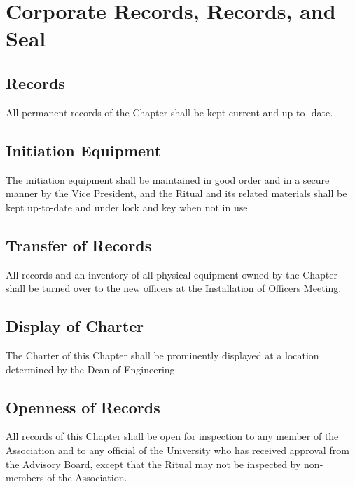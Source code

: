 \documentclass{article}
\begin{document}
	\section{Corporate Records, Records, and Seal}
	\subsection{Records}
	All permanent records of the Chapter shall be kept current and up-to- date.
	\subsection{Initiation Equipment}
	The initiation equipment shall be maintained in good order and in a secure manner by the Vice President, and the Ritual and its related materials shall be kept up-to-date and under lock and key when not in use.
	\subsection{Transfer of Records}
	All records and an inventory of all physical equipment owned by the Chapter shall be turned over to the new officers at the Installation of Officers Meeting.
	\subsection{Display of Charter}
	The Charter of this Chapter shall be prominently displayed at a location determined by the Dean of Engineering.
	\subsection{Openness of Records}
	All records of this Chapter shall be open for inspection to any member of the Association and to any official of the University who has received approval from the Advisory Board, except that the Ritual may not be inspected by non-members of the Association.
\end{document}

